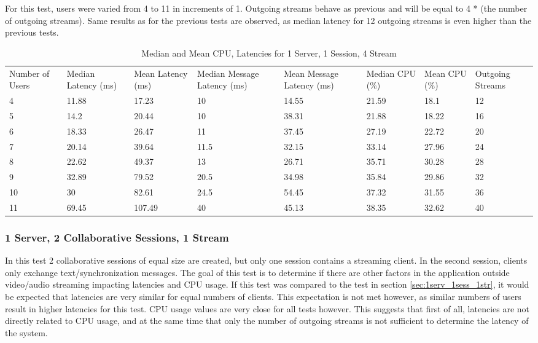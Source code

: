 For this test, users were varied from 4 to 11 in increments of 1. Outgoing streams behave as previous and will be equal to 4 * (the number of outgoing streams). Same results as for the previous tests are observed, as median latency for 12 outgoing streams is even higher than the previous tests.

\begin{table}
\caption{Median and Mean CPU, Latencies for 1 Server, 1 Session, 4 Stream}
\label{table:1serv_1sess_4str}
\begin{tabu} to\linewidth{|X[c]|X[c]|X[c]|X[c]|X[c]|X[c]|X[c]|X[c]|}
\everyrow{\hline}
\hline
Number of Users & Median Latency (ms) & Mean Latency (ms) & Median Message Latency (ms) & Mean Message Latency (ms) & Median CPU (\%) & Mean CPU (\%) & Outgoing Streams\\
4 & 11.88 & 17.23 & 10 & 14.55 & 21.59 & 18.1 & 12 \\
5 & 14.2 & 20.44 & 10 & 38.31 & 21.88 & 18.22 & 16 \\
6 & 18.33 & 26.47 & 11 & 37.45 & 27.19 & 22.72 & 20 \\
7 & 20.14 & 39.64 & 11.5 & 32.15 & 33.14 & 27.96 & 24 \\
8 & 22.62 & 49.37 & 13 & 26.71 & 35.71 & 30.28 & 28 \\
9 & 32.89 & 79.52 & 20.5 & 34.98 & 35.84 & 29.86 & 32 \\
10 & 30 & 82.61 & 24.5 & 54.45 & 37.32 & 31.55 & 36 \\
11 & 69.45 & 107.49 & 40 & 45.13 & 38.35 & 32.62 & 40 \\
\end{tabu}
\end{table}

\clearpage\subsubsection{1 Server, 2 Collaborative Sessions, 1 Stream}
\label{sec:1serv_2sess_1str180}

In this test 2 collaborative sessions of equal size are created, but only one session contains a streaming client. In the second session, clients only exchange text/synchronization messages. The goal of this test is to determine if there are other factors in the application outside video/audio streaming impacting latencies and CPU usage. If this test was compared to the test in section \ref{sec:1serv_1sess_1str}, it would be expected that latencies are very similar for equal numbers of clients. This expectation is not met however, as similar numbers of users result in higher latencies for this test. CPU usage values are very close for all tests however. This suggests that first of all, latencies are not directly related to CPU usage, and at the same time that only the number of outgoing streams is not sufficient to determine the latency of the system.

